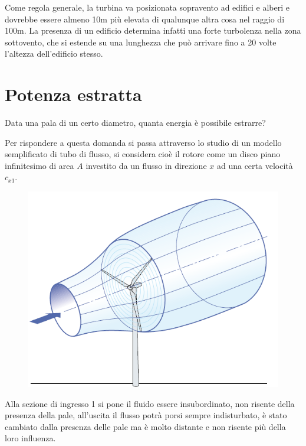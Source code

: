 \documentclass[a4paper, 15pt]{article}
\begin{document}
\begin{adjustwidth}{2in}{}
	Come regola generale, la turbina va posizionata
	sopravento ad edifici e alberi e dovrebbe essere
	almeno 10m più elevata di qualunque altra cosa
	nel raggio di 100m.
	La presenza di un edificio determina infatti una
	forte turbolenza nella zona sottovento, che si
	estende su una lunghezza che può arrivare fino a
	20 volte l’altezza dell’edificio stesso.
\end{adjustwidth}



\section{Potenza estratta}

\begin{adjustwidth}{2in}{}
	Data una pala di un certo diametro, quanta energia è possibile estrarre? \newline 
	
	Per rispondere a questa domanda si passa attraverso lo studio di un modello semplificato di tubo di flusso, si considera cioè il rotore come un disco piano infinitesimo di area $A$ investito da un flusso in direzione $x$ ad una certa velocità $c_{x1}$. 
	\begin{figure}[H]
		\centering
		\includegraphics[width=0.3\linewidth]{immagini/eoliche14}
		\label{fig:eoliche14}
	\end{figure}
	Alla sezione di ingresso 1 si pone il fluido essere insubordinato, non risente della presenza della pale, all'uscita il flusso potrà porsi sempre indisturbato, è stato cambiato dalla presenza delle pale ma è molto distante e non risente più della loro influenza. 
	

\end{adjustwidth}
\end{document}
